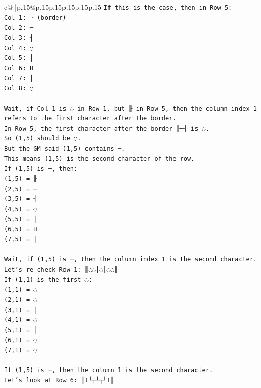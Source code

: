 \documentclass{article}
\begin{document}
{\begin{supertabular}{c@{$\;$}|p{.15\linewidth}@{}p{.15\linewidth}p{.15\linewidth}p{.15\linewidth}p{.15\linewidth}p{.15\linewidth}}
{{{\texttt{If this is the case, then in Row 5:} \\
\texttt{Col 1: ╟ (border)} \\
\texttt{Col 2: ─} \\
\texttt{Col 3: ┤} \\
\texttt{Col 4: ◌} \\
\texttt{Col 5: │} \\
\texttt{Col 6: H} \\
\texttt{Col 7: │} \\
\texttt{Col 8: ◌} \\
\\ 
\texttt{Wait, if Col 1 is ◌ in Row 1, but ╟ in Row 5, then the column index 1 refers to the first character after the border.} \\
\texttt{In Row 5, the first character after the border ╟─┤ is ◌.} \\
\texttt{So (1,5) should be ◌.} \\
\texttt{But the GM said (1,5) contains ─.} \\
\texttt{This means (1,5) is the second character of the row.} \\
\texttt{If (1,5) is ─, then:} \\
\texttt{(1,5) = ╟} \\
\texttt{(2,5) = ─} \\
\texttt{(3,5) = ┤} \\
\texttt{(4,5) = ◌} \\
\texttt{(5,5) = │} \\
\texttt{(6,5) = H} \\
\texttt{(7,5) = │} \\
\\ 
\texttt{Wait, if (1,5) is ─, then the column index 1 is the second character.} \\
\texttt{Let's re{-}check Row 1: ║◌◌│◌│◌◌║} \\
\texttt{If (1,1) is the first ◌:} \\
\texttt{(1,1) = ◌} \\
\texttt{(2,1) = ◌} \\
\texttt{(3,1) = │} \\
\texttt{(4,1) = ◌} \\
\texttt{(5,1) = │} \\
\texttt{(6,1) = ◌} \\
\texttt{(7,1) = ◌} \\
\\ 
\texttt{If (1,5) is ─, then the column 1 is the second character.} \\
\texttt{Let's look at Row 6: ║I└┬┴┬┘T║} \\
}}}
\end{supertabular}}
\end{document}
